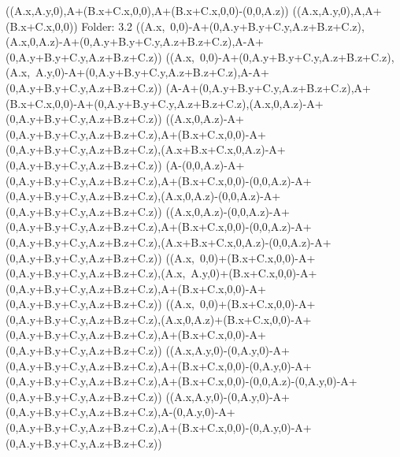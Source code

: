 \left(\left(A.x,A.y,0\right),A+\left(B.x+C.x,0,0\right),A+\left(B.x+C.x,0,0\right)-\left(0,0,A.z\right)\right)
\left(\left(A.x,A.y,0\right),A,A+\left(B.x+C.x,0,0\right)\right)
Folder: 3.2
\left(\left(A.x,\ 0,0\right)-A+\left(0,A.y+B.y+C.y,A.z+B.z+C.z\right),\left(A.x,0,A.z\right)-A+\left(0,A.y+B.y+C.y,A.z+B.z+C.z\right),A-A+\left(0,A.y+B.y+C.y,A.z+B.z+C.z\right)\right)
\left(\left(A.x,\ 0,0\right)-A+\left(0,A.y+B.y+C.y,A.z+B.z+C.z\right),\left(A.x,\ A.y,0\right)-A+\left(0,A.y+B.y+C.y,A.z+B.z+C.z\right),A-A+\left(0,A.y+B.y+C.y,A.z+B.z+C.z\right)\right)
\left(A-A+\left(0,A.y+B.y+C.y,A.z+B.z+C.z\right),A+\left(B.x+C.x,0,0\right)-A+\left(0,A.y+B.y+C.y,A.z+B.z+C.z\right),\left(A.x,0,A.z\right)-A+\left(0,A.y+B.y+C.y,A.z+B.z+C.z\right)\right)
\left(\left(A.x,0,A.z\right)-A+\left(0,A.y+B.y+C.y,A.z+B.z+C.z\right),A+\left(B.x+C.x,0,0\right)-A+\left(0,A.y+B.y+C.y,A.z+B.z+C.z\right),\left(A.x+B.x+C.x,0,A.z\right)-A+\left(0,A.y+B.y+C.y,A.z+B.z+C.z\right)\right)
\left(A-\left(0,0,A.z\right)-A+\left(0,A.y+B.y+C.y,A.z+B.z+C.z\right),A+\left(B.x+C.x,0,0\right)-\left(0,0,A.z\right)-A+\left(0,A.y+B.y+C.y,A.z+B.z+C.z\right),\left(A.x,0,A.z\right)-\left(0,0,A.z\right)-A+\left(0,A.y+B.y+C.y,A.z+B.z+C.z\right)\right)
\left(\left(A.x,0,A.z\right)-\left(0,0,A.z\right)-A+\left(0,A.y+B.y+C.y,A.z+B.z+C.z\right),A+\left(B.x+C.x,0,0\right)-\left(0,0,A.z\right)-A+\left(0,A.y+B.y+C.y,A.z+B.z+C.z\right),\left(A.x+B.x+C.x,0,A.z\right)-\left(0,0,A.z\right)-A+\left(0,A.y+B.y+C.y,A.z+B.z+C.z\right)\right)
\left(\left(A.x,\ 0,0\right)+\left(B.x+C.x,0,0\right)-A+\left(0,A.y+B.y+C.y,A.z+B.z+C.z\right),\left(A.x,\ A.y,0\right)+\left(B.x+C.x,0,0\right)-A+\left(0,A.y+B.y+C.y,A.z+B.z+C.z\right),A+\left(B.x+C.x,0,0\right)-A+\left(0,A.y+B.y+C.y,A.z+B.z+C.z\right)\right)
\left(\left(A.x,\ 0,0\right)+\left(B.x+C.x,0,0\right)-A+\left(0,A.y+B.y+C.y,A.z+B.z+C.z\right),\left(A.x,0,A.z\right)+\left(B.x+C.x,0,0\right)-A+\left(0,A.y+B.y+C.y,A.z+B.z+C.z\right),A+\left(B.x+C.x,0,0\right)-A+\left(0,A.y+B.y+C.y,A.z+B.z+C.z\right)\right)
\left(\left(A.x,A.y,0\right)-\left(0,A.y,0\right)-A+\left(0,A.y+B.y+C.y,A.z+B.z+C.z\right),A+\left(B.x+C.x,0,0\right)-\left(0,A.y,0\right)-A+\left(0,A.y+B.y+C.y,A.z+B.z+C.z\right),A+\left(B.x+C.x,0,0\right)-\left(0,0,A.z\right)-\left(0,A.y,0\right)-A+\left(0,A.y+B.y+C.y,A.z+B.z+C.z\right)\right)
\left(\left(A.x,A.y,0\right)-\left(0,A.y,0\right)-A+\left(0,A.y+B.y+C.y,A.z+B.z+C.z\right),A-\left(0,A.y,0\right)-A+\left(0,A.y+B.y+C.y,A.z+B.z+C.z\right),A+\left(B.x+C.x,0,0\right)-\left(0,A.y,0\right)-A+\left(0,A.y+B.y+C.y,A.z+B.z+C.z\right)\right)
